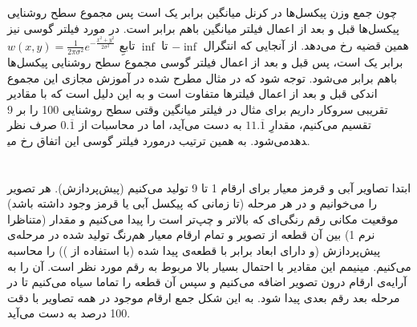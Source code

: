 \documentclass{article}
\begin{document}
\section{}%
چون جمع وزن پیکسل‌ها در کرنل میانگین برابر یک است پس مجموع سطح روشنایی پیکسل‌ها قبل و بعد از اعمال فیلتر میانگین باهم برابر است. در مورد فیلتر گوسی نیز همین قضیه رخ می‌دهد. از آنجایی که انتگرال $-\inf$ تا $\inf$ تابعِ
$
w(x, y)=\frac{1}{2\pi\sigma^{2}}e^{-\frac{x^{2}+y^{2}}{2\sigma^{2}}}
$
برابر یک است، پس قبل و بعد از اعمال فیلتر گوسی مجموع سطح روشنایی پیکسل‌ها باهم برابر می‌شود. توجه شود که در مثال مطرح شده در آموزش مجازی این مجموع اندکی قبل و بعد از اعمال فیلترها متفاوت است و به این دلیل است که با مقادیر تقریبی سروکار داریم برای مثال در فیلتر میانگین وقتی سطح روشنایی 100 را بر 9 تقسیم می‌کنیم، مقدارِ
$11.\overline{1}$
به دست می‌آید، اما در محاسبات از
$
0.\overline{1}
$
صرف نظر می‌شود. به همین ترتیب درمورد فیلتر گوسی این اتفاق رخ می‎دهد.
\section{}%
\subsection{}
ابتدا تصاویر آبی و قرمز معیار برای ارقام 1 تا 9 تولید می‌کنیم (پیش‌پردازش). هر تصویر را می‌خوانیم و در هر مرحله (تا زمانی که پیکسل آبی یا قرمز وجود داشته باشد) موقعیت مکانی رقم رنگی‌ای که بالاتر و چپ‌تر است را پیدا می‌کنیم و مقدار  (متناظرا نرم 1) بین آن قطعه از تصویر و تمام ارقام معیار هم‌رنگ تولید شده در مرحله‌ی پیش‌پردازش (و دارای ابعاد برابر با قطعه‌ی پیدا شده (با استفاده از )) را محاسبه می‌کنیم. مینیمم این مقادیر با احتمال بسیار بالا مربوط به رقم مورد نظر است. آن را به آرایه‌ی ارقام درون تصویر اضافه می‌کنیم و سپس آن قطعه را تماما سیاه می‌کنیم تا در مرحله بعد رقم بعدی پیدا شود. به این شکل جمع ارقام موجود در همه تصاویر با دقت 100 درصد به دست می‌آید.
\subsection{}
\begin{latin}

\end{latin}
\subsection{}
\begin{latin}

\end{latin}
\end{document}
